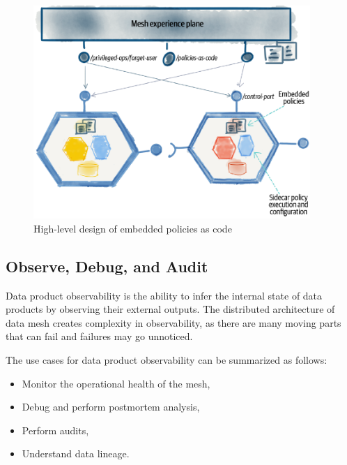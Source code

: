 \documentclass[12pt, a4paper]{book}
\begin{document}
\begin{figure}
	\begin{framed}
		\centering
		\includegraphics[width=10.5cm]{GovernData.png}
		\caption{High-level design of embedded policies as code}
		\label{GovernData}
	\end{framed}
\end{figure}

\subsection{Observe, Debug, and Audit}
Data product observability is the ability to infer the internal state of data products by observing their external outputs. The distributed architecture of data mesh creates complexity in observability, as there are many moving parts that can fail and failures may go unnoticed.

The use cases for data product observability can be summarized as follows:
	\begin{itemize}
		\item Monitor the operational health of the mesh,
		\item Debug and perform postmortem analysis,
		\item Perform audits,
		\item Understand data lineage.
	\end{itemize}
\end{document}
